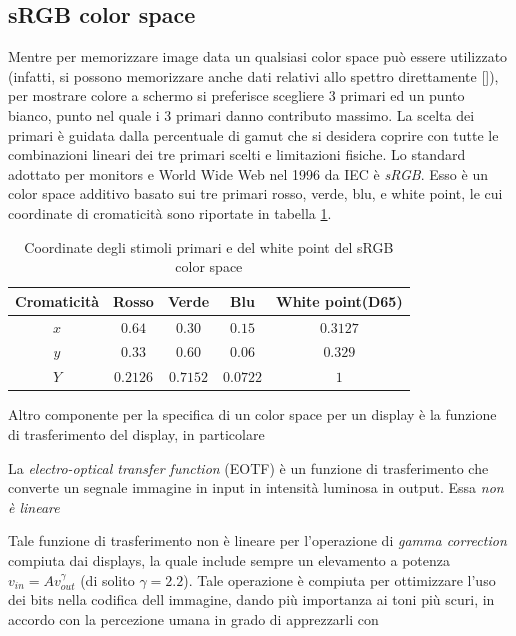 \subsection{sRGB color space}
Mentre per memorizzare image data un qualsiasi color space pu\`o essere utilizzato (infatti, si possono memorizzare anche dati relativi allo spettro 
direttamente [\cite{fichet}]), per mostrare colore a schermo si preferisce scegliere 3 primari ed un punto bianco, punto nel quale i 3 primari danno
contributo massimo. La scelta dei primari \`e guidata dalla percentuale di gamut che si desidera coprire con tutte le combinazioni lineari dei tre
primari scelti e limitazioni fisiche. Lo standard adottato per monitors e World Wide Web nel 1996 da IEC \`e \textit{sRGB}. Esso \`e un color space 
additivo basato sui tre primari rosso, verde, blu, e white point, le cui coordinate di cromaticit\`a sono riportate in tabella 
\ref{chapter2:colorimetry:sRGB}.\par
\begin{table}
	\begin{tabularx}{\linewidth}{ccccc}
		\toprule
		Cromaticit\`a & Rosso & Verde & Blu & White point(D65)\\
		\midrule
		$x$ & $0.64$ & $0.30$ & $0.15$ & $0.3127$\\
		$y$ & $0.33$ & $0.60$ & $0.06$ & $0.329$\\
		$Y$ & $0.2126$ & $0.7152$ & $0.0722$ & $1$\\
		\bottomrule
	\end{tabularx}
	\label{chapter2:colorimetry:sRGB}
	\caption{Coordinate degli stimoli primari e del white point del sRGB color space}
\end{table}
Altro componente per la specifica di un color space per un display \`e la funzione di trasferimento del display, in particolare 
\begin{definitionS}
	La \textit{electro-optical transfer function} (EOTF) \`e un funzione di trasferimento che converte un segnale immagine in input in intensit\`a 
	luminosa in output. Essa \textit{non \`e lineare}
\end{definitionS}
Tale funzione di trasferimento non \`e lineare per l'operazione di \textit{gamma correction} compiuta dai displays, la quale include sempre un 
elevamento a potenza $v_{in} = Av_{out}^\gamma$ (di solito $\gamma = 2.2$). Tale operazione \`e compiuta per ottimizzare l'uso dei bits 
nella codifica dell immagine, dando pi\`u importanza ai toni pi\`u scuri, in accordo con la percezione umana in grado di apprezzarli con 
